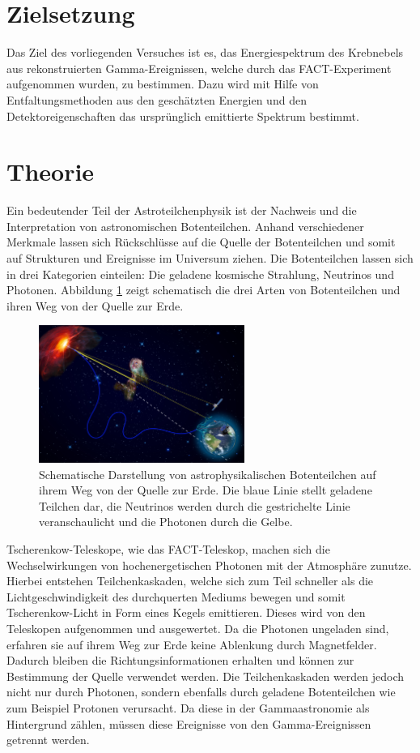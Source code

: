 \section{Zielsetzung}
Das Ziel des vorliegenden Versuches ist es, das Energiespektrum des Krebnebels aus rekonstruierten Gamma-Ereignissen, welche durch das FACT-Experiment aufgenommen wurden, zu bestimmen. Dazu wird mit Hilfe von Entfaltungsmethoden aus den geschätzten Energien und den Detektoreigenschaften das ursprünglich emittierte Spektrum bestimmt.

\section{Theorie}
Ein bedeutender Teil der Astroteilchenphysik ist der Nachweis und die Interpretation von astronomischen Botenteilchen. Anhand verschiedener Merkmale lassen sich Rückschlüsse auf die Quelle der Botenteilchen und somit auf Strukturen und Ereignisse im Universum ziehen. Die Botenteilchen lassen sich in drei Kategorien einteilen: Die geladene kosmische Strahlung, Neutrinos und Photonen. 
Abbildung \ref{fig:Boten} zeigt schematisch die drei Arten von Botenteilchen und ihren Weg von der Quelle zur Erde.
\begin{figure}
  \centering
  \includegraphics[width=0.6\textwidth]{graphics/Folie5.png}
  \caption{Schematische Darstellung von astrophysikalischen Botenteilchen auf ihrem Weg von der Quelle zur Erde. Die blaue Linie stellt geladene Teilchen dar, die Neutrinos werden durch die gestrichelte Linie veranschaulicht und die Photonen durch die Gelbe.\cite{anleitung}}
  \label{fig:Boten}
\end{figure}
\FloatBarrier
Tscherenkow-Teleskope, wie das FACT-Teleskop, machen sich die Wechselwirkungen von hochenergetischen Photonen mit der Atmosphäre zunutze. Hierbei entstehen Teilchenkaskaden, welche sich zum Teil schneller als die Lichtgeschwindigkeit des durchquerten Mediums bewegen und somit Tscherenkow-Licht in Form eines Kegels emittieren. Dieses wird von den Teleskopen aufgenommen und ausgewertet.
Da die Photonen ungeladen sind, erfahren sie auf ihrem Weg zur Erde keine Ablenkung durch Magnetfelder. Dadurch bleiben die Richtungsinformationen erhalten und können zur Bestimmung der Quelle verwendet werden.
Die Teilchenkaskaden werden jedoch nicht nur durch Photonen, sondern ebenfalls durch geladene Botenteilchen wie zum Beispiel Protonen verursacht. Da diese in der Gammaastronomie als Hintergrund zählen, müssen diese Ereignisse von den Gamma-Ereignissen getrennt werden.


